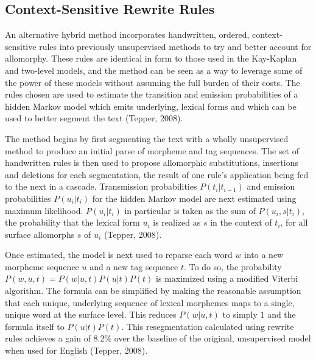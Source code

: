\documentclass[12pt]{article}
\begin{document}
\subsection{Context-Sensitive Rewrite Rules}
An alternative hybrid method incorporates handwritten, ordered, context-sensitive rules into previously unsupervised methods to try and better account for allomorphy. These rules are identical in form to those used in the Kay-Kaplan and two-level models, and the method can be seen as a way to leverage some of the power of these models without assuming the full burden of their costs. The rules chosen are used to estimate the transition and emission probabilities of a hidden Markov model which emits underlying, lexical forms and which can be used to better segment the text (Tepper, 2008).

The method begins by first segmenting the text with a wholly unsupervised method to produce an initial parse of morpheme and tag sequences. The set of handwritten rules is then used to propose allomorphic substitutions, insertions and deletions for each segmentation, the result of one rule's application being fed to the next in a cascade. Transmission probabilities $P(t_i \vert t_{i-1})$ and emission probabilities $P(u_i|t_i)$ for the hidden Markov model are next estimated using maximum likelihood. $P(u_i|t_i)$ in particular is taken as the sum of $P(u_i,s|t_i)$, the probability that the lexical form $u_i$ is realized as $s$ in the context of $t_i$, for all surface allomorphs $s$ of $u_i$ (Tepper, 2008).

Once estimated, the model is next used to reparse each word $w$ into a new morpheme sequence $u$ and a new tag sequence $t$. To do so, the probability $P(w,u,t)=P(w \vert u,t)P(u \vert t)P(t)$ is maximized using a modified Viterbi algorithm. The formula can be simplified by making the reasonable assumption that each unique, underlying sequence of lexical morphemes maps to a single, unique word at the surface level. This reduces $P(w|u,t)$ to simply $1$ and the formula itself to $P(u \vert t)P(t)$. This resegmentation calculated using rewrite rules achieves a gain of 8.2\% over the baseline of the original, unsupervised model when used for English (Tepper, 2008). 
\end{document}
